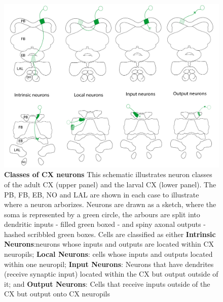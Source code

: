          \begin{figure} [H]
                \centering
                \includegraphics[width=12cm]{Figs/CX/CX_Nomenclature_Neurons.pdf}
                \caption[Central Complex Neuron Classes]{\textbf{Classes of CX neurons} This schematic illustrates neuron classes of the adult CX (upper panel) and the larval CX (lower panel). The PB, FB, EB, NO and LAL are shown in each case to illustrate where a neuron arborizes. Neurons are drawn as a sketch, where the soma is represented by a green circle, the arbours are split into dendritic inputs - filled green boxed - and spiny axonal outputs - hashed scribbled green boxes. Cells are classified as either \textbf{Intrinsic Neurons}:neurons whose inputs and outputs are located within CX neuropils; \textbf{Local Neurons}: cells whose inputs and outputs located within one neuropil; \textbf{Input Neurons}: Neurons that have  dendrites (receive synaptic input) located within the CX but output outside of it; and \textbf{Output Neurons}: Cells that receive inputs outside of the CX but output onto CX neuropils}
                \label{CXclasses}
            \end{figure}
